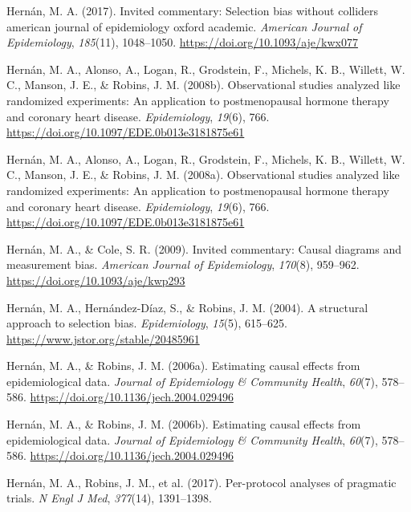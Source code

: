 \documentclass[
  single column]{article}
\newlength{\cslhangindent}
\newenvironment{CSLReferences}[2] %
 {\begin{list}{}{%
  \setlength{\itemindent}{0pt}
  \setlength{\leftmargin}{0pt}
  \setlength{\parsep}{0pt}
  \ifodd #1
   \setlength{\leftmargin}{\cslhangindent}
   \setlength{\itemindent}{-1\cslhangindent}
  \fi
  \setlength{\itemsep}{#2\baselineskip}}}
 {\end{list}}
\begin{document}
\begin{CSLReferences}{1}{0}
Hernán, M. A. (2017). Invited commentary: Selection bias without
colliders \textbar{} american journal of epidemiology \textbar{} oxford
academic. \emph{American Journal of Epidemiology}, \emph{185}(11),
1048--1050. \url{https://doi.org/10.1093/aje/kwx077}

Hernán, M. A., Alonso, A., Logan, R., Grodstein, F., Michels, K. B.,
Willett, W. C., Manson, J. E., \& Robins, J. M. (2008b). Observational
studies analyzed like randomized experiments: An application to
postmenopausal hormone therapy and coronary heart disease.
\emph{Epidemiology}, \emph{19}(6), 766.
\url{https://doi.org/10.1097/EDE.0b013e3181875e61}

Hernán, M. A., Alonso, A., Logan, R., Grodstein, F., Michels, K. B.,
Willett, W. C., Manson, J. E., \& Robins, J. M. (2008a). Observational
studies analyzed like randomized experiments: An application to
postmenopausal hormone therapy and coronary heart disease.
\emph{Epidemiology}, \emph{19}(6), 766.
\url{https://doi.org/10.1097/EDE.0b013e3181875e61}

Hernán, M. A., \& Cole, S. R. (2009). Invited commentary: Causal
diagrams and measurement bias. \emph{American Journal of Epidemiology},
\emph{170}(8), 959--962. \url{https://doi.org/10.1093/aje/kwp293}

Hernán, M. A., Hernández-Díaz, S., \& Robins, J. M. (2004). A structural
approach to selection bias. \emph{Epidemiology}, \emph{15}(5), 615--625.
\url{https://www.jstor.org/stable/20485961}

Hernán, M. A., \& Robins, J. M. (2006a). Estimating causal effects from
epidemiological data. \emph{Journal of Epidemiology \& Community
Health}, \emph{60}(7), 578--586.
\url{https://doi.org/10.1136/jech.2004.029496}

Hernán, M. A., \& Robins, J. M. (2006b). Estimating causal effects from
epidemiological data. \emph{Journal of Epidemiology \& Community
Health}, \emph{60}(7), 578--586.
\url{https://doi.org/10.1136/jech.2004.029496}

Hernán, M. A., Robins, J. M., et al. (2017). Per-protocol analyses of
pragmatic trials. \emph{N Engl J Med}, \emph{377}(14), 1391--1398.


\end{CSLReferences}
\end{document}
